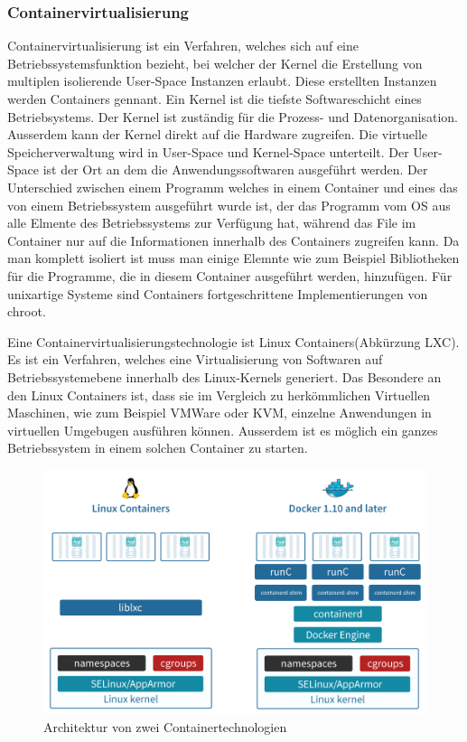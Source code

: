 \documentclass[10pt]{article}
\begin{document}
	\subsubsection{Containervirtualisierung}
	Containervirtualisierung ist ein Verfahren, welches sich auf eine Betriebssystemsfunktion bezieht, bei welcher der Kernel die Erstellung von multiplen isolierende User-Space Instanzen erlaubt. Diese erstellten Instanzen werden Containers gennant.\cite{OSlv} Ein Kernel ist die tiefste Softwareschicht eines Betriebsystems. Der Kernel ist zuständig für die Prozess- und Datenorganisation. Ausserdem kann der Kernel direkt auf die Hardware zugreifen.\cite{kernel} Die virtuelle Speicherverwaltung wird in User-Space und Kernel-Space unterteilt. Der User-Space ist der Ort an dem die  Anwendungssoftwaren ausgeführt werden. \cite{userSpace}
Der Unterschied zwischen einem Programm welches in einem Container und eines das von einem Betriebssystem ausgeführt wurde ist, der das Programm vom OS aus alle Elmente des Betriebssystems zur Verfügung hat, während das File im Container nur auf die Informationen innerhalb des Containers zugreifen kann. Da man komplett isoliert ist muss man einige Elemnte wie zum Beispiel Bibliotheken für die Programme, die in diesem Container ausgeführt werden, hinzufügen. 
Für unixartige Systeme sind Containers fortgeschrittene Implementierungen von chroot. \cite{OSlv}
	
	Eine Containervirtualisierungstechnologie ist Linux Containers(Abkürzung LXC). Es ist ein Verfahren, welches eine Virtualisierung von Softwaren auf Betriebssystemebene innerhalb des Linux-Kernels generiert. 
Das Besondere an den Linux Containers ist, dass sie im Vergleich zu herkömmlichen Virtuellen Maschinen, wie zum Beispiel VMWare oder KVM, einzelne Anwendungen in virtuellen Umgebugen ausführen können. Ausserdem ist es möglich ein ganzes Betriebssystem in einem solchen Container zu starten.  \cite{lxc}

\begin{figure}[h!]
    \centering
    \includegraphics[width=12cm]{Bilder/ContainerArchitektur.png}
    \caption{Architektur von zwei Containertechnologien \cite{container}}
\end{figure}
\end{document}
